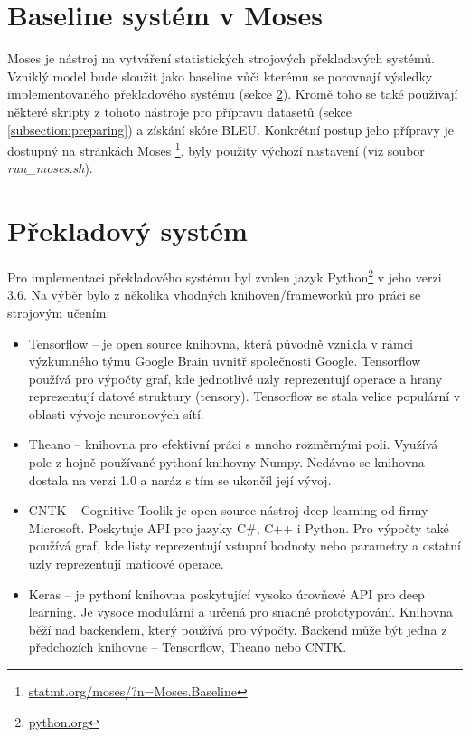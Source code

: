 \section{Baseline systém v Moses}\label{section:baseline}
Moses \cite{moses} je nástroj na vytváření statistických strojových překladových systémů. Vzniklý model bude sloužit jako baseline vůči kterému se porovnají výsledky implementovaného překladového systému (sekce \ref{section:nmtSystem}). Kromě toho se také používají některé skripty z tohoto nástroje pro přípravu datasetů (sekce \ref{subsection:preparing}) a získání skóre BLEU. Konkrétní postup jeho přípravy je dostupný na stránkách Moses \footnote{\url{statmt.org/moses/?n=Moses.Baseline}}, byly použity výchozí nastavení (viz soubor \emph{run\_moses.sh}). 



\section{Překladový systém}\label{section:nmtSystem}
Pro implementaci překladového systému byl zvolen jazyk Python\footnote{\url{python.org}} v jeho verzi 3.6. Na výběr bylo z několika vhodných knihoven/frameworků pro práci se strojovým učením:

\begin{itemize}
  \item Tensorflow -- je open source knihovna, která původně vznikla v rámci výzkumného týmu Google Brain uvnitř společnosti Google. Tensorflow používá pro výpočty graf, kde jednotlivé uzly reprezentují operace a hrany reprezentují datové struktury (tensory). Tensorflow se stala velice populární v oblasti vývoje neuronových sítí.
  \item Theano -- knihovna pro efektivní práci s mnoho rozměrnými poli. Využívá pole z hojně používané pythoní knihovny Numpy. Nedávno se knihovna dostala na verzi 1.0 a naráz s tím se ukončil její vývoj.
  \item CNTK -- Cognitive Toolik je open-source nástroj deep learning od firmy Microsoft. Poskytuje API pro jazyky C\#, C++ i Python. Pro výpočty také používá graf, kde listy reprezentují vstupní hodnoty nebo parametry a ostatní uzly reprezentují maticové operace.
  \item Keras -- je pythoní knihovna poskytující vysoko úrovňové API pro deep learning. Je vysoce modulární a určená pro snadné prototypování. Knihovna běží nad backendem, který používá pro výpočty. Backend může být jedna z předchozích knihovne -- Tensorflow, Theano nebo CNTK.
\end{itemize}


